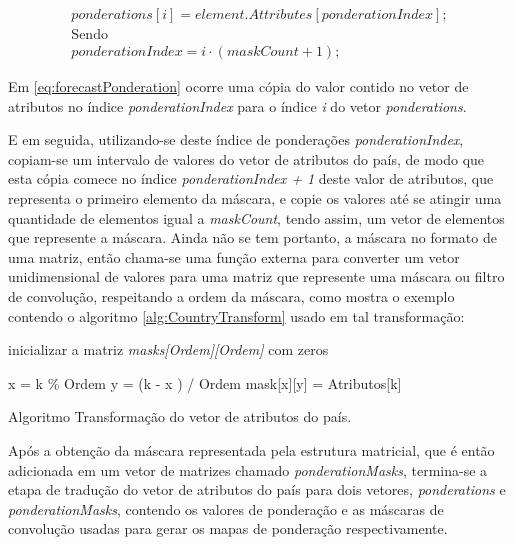 \begin{equation}
\label{eq:forecastPonderation}
\begin{split}
ponderations[i] = element.Attributes[ponderationIndex];\\
\text{Sendo}\\
ponderationIndex = i \cdot (maskCount + 1);
\end{split}
\end{equation}


Em \ref{eq:forecastPonderation} ocorre uma cópia do valor contido no vetor de atributos no índice \emph{ponderationIndex} para o índice \emph{i} do vetor \emph{ponderations}.

E em seguida, utilizando-se deste índice de ponderações \emph{ponderationIndex}, copiam-se um intervalo de valores do vetor de atributos do país, de modo que esta cópia comece no índice \emph{ponderationIndex + 1} deste valor de atributos, que representa o primeiro elemento da máscara, e copie os valores até se atingir uma quantidade de elementos igual a \emph{maskCount}, tendo assim, um vetor de elementos que represente a máscara. Ainda não se tem portanto, a máscara no formato de uma matriz, então chama-se uma função externa para converter um vetor unidimensional de valores para uma matriz que represente uma máscara ou filtro de convolução, respeitando a ordem da máscara, como mostra o exemplo contendo o algoritmo \ref{alg:CountryTransform} usado em tal transformação:

\vspace{10px}
\begin{algorithm}[h]
\SetAlgoLined
{}
inicializar a matriz \emph{masks[Ordem][Ordem]} com zeros\;

{
x = k \% Ordem\;
y = (k - x ) / Ordem\;
mask[x][y] = Atributos[k]\; 
}
\caption{ Algoritmo Transformação do vetor de atributos do país.}
\label{alg:CountryTransform}
\end{algorithm}

Após a obtenção da máscara representada pela estrutura matricial, que é então adicionada em um vetor de matrizes chamado \emph{ponderationMasks}, termina-se a etapa de tradução do vetor de atributos do país para dois vetores, \emph{ponderations} e \emph{ponderationMasks}, contendo os valores de ponderação e as máscaras de convolução usadas para gerar os mapas de ponderação respectivamente.

